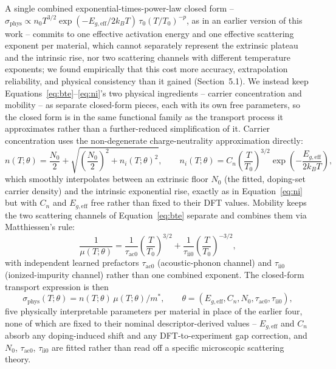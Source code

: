 \documentclass[11pt]{article}
\begin{document}
A single combined exponential-times-power-law closed form -- $\sigma_{\text{phys}} \propto n_0 T^{3/2}\exp(-E_{g,\text{eff}}/2k_BT)\,\tau_0(T/T_0)^{-p}$, as in an earlier version of this work -- commits to one effective activation energy and one effective scattering exponent per material, which cannot separately represent the extrinsic plateau and the intrinsic rise, nor two scattering channels with different temperature exponents; we found empirically that this cost more accuracy, extrapolation reliability, and physical consistency than it gained (Section~5.1). We instead keep Equations~\ref{eq:bte}--\ref{eq:ni}'s two physical ingredients -- carrier concentration and mobility -- as separate closed-form pieces, each with its own free parameters, so the closed form is in the same functional family as the transport process it approximates rather than a further-reduced simplification of it. Carrier concentration uses the non-degenerate charge-neutrality approximation directly:
\begin{equation}
n(T;\theta) = \frac{N_0}{2} + \sqrt{\left(\frac{N_0}{2}\right)^2 + n_i(T;\theta)^2}, \qquad
n_i(T;\theta) = C_n \left(\frac{T}{T_0}\right)^{3/2} \exp\!\left(-\frac{E_{g,\text{eff}}}{2 k_B T}\right),
\label{eq:n_closed}
\end{equation}
which smoothly interpolates between an extrinsic floor $N_0$ (the fitted, doping-set carrier density) and the intrinsic exponential rise, exactly as in Equation~\ref{eq:ni} but with $C_n$ and $E_{g,\text{eff}}$ free rather than fixed to their DFT values. Mobility keeps the two scattering channels of Equation~\ref{eq:bte} separate and combines them via Matthiessen's rule:
\begin{equation}
\frac{1}{\mu(T;\theta)} = \frac{1}{\tau_{\text{ac}0}}\left(\frac{T}{T_0}\right)^{3/2} + \frac{1}{\tau_{\text{ii}0}}\left(\frac{T}{T_0}\right)^{-3/2},
\label{eq:mu_closed}
\end{equation}
with independent learned prefactors $\tau_{\text{ac}0}$ (acoustic-phonon channel) and $\tau_{\text{ii}0}$ (ionized-impurity channel) rather than one combined exponent. The closed-form transport expression is then
\begin{equation}
\sigma_{\text{phys}}(T;\theta) = n(T;\theta)\,\mu(T;\theta) / m^{*}, \qquad \theta = (E_{g,\text{eff}}, C_n, N_0, \tau_{\text{ac}0}, \tau_{\text{ii}0}),
\label{eq:sigma_phys}
\end{equation}
five physically interpretable parameters per material in place of the earlier four, none of which are fixed to their nominal descriptor-derived values -- $E_{g,\text{eff}}$ and $C_n$ absorb any doping-induced shift and any DFT-to-experiment gap correction, and $N_0$, $\tau_{\text{ac}0}$, $\tau_{\text{ii}0}$ are fitted rather than read off a specific microscopic scattering theory.
\end{document}
